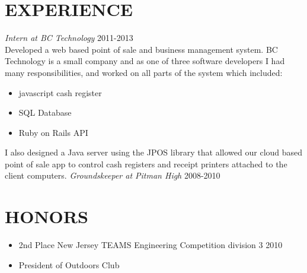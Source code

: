 \documentclass[line, margin]{res}
\begin{document}
\begin{resume}
    \section{EXPERIENCE}
    \textit{Intern at BC Technology} \hfill 2011-2013 \\
    Developed a web based point of sale and business management system.
    BC Technology is a small company and as one of three software developers
    I had many responsibilities, and worked on all parts of the system which included:
    \begin{itemize}
      \item javascript cash register
      \item SQL Database
      \item Ruby on Rails API
    \end{itemize}
    I also designed a Java server using the JPOS library that allowed our cloud based point of sale app
    to control cash registers and receipt printers attached to the client computers.
    \textit{Groundskeeper at Pitman High} \hfill 2008-2010 \\
    \section{HONORS}
    \begin{itemize}
      \item 2nd Place New Jersey TEAMS Engineering Competition division 3 2010
      \item President of Outdoors Club
    \end{itemize}
  \end{resume}
\end{document}
